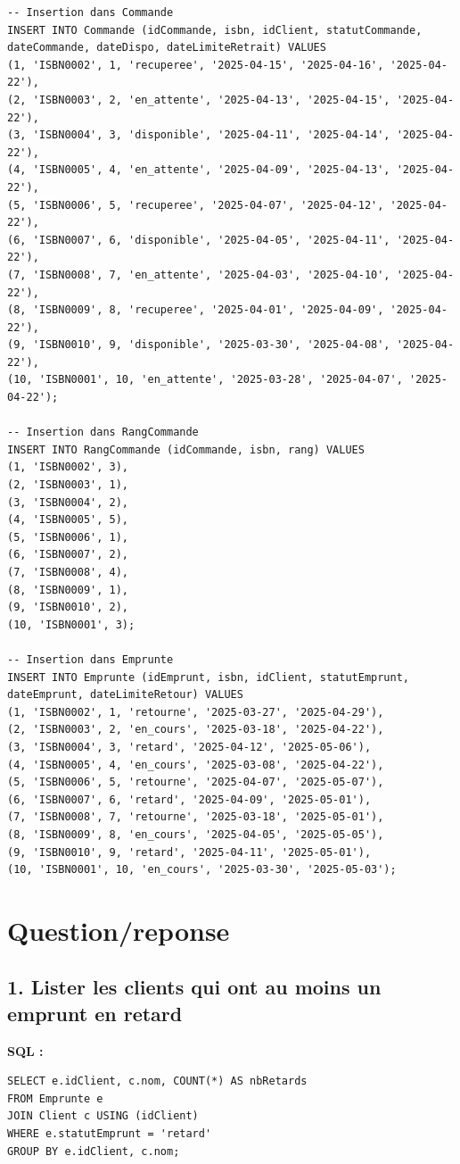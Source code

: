 \documentclass{article}
\begin{document}
\begin{lstlisting}
-- Insertion dans Commande
INSERT INTO Commande (idCommande, isbn, idClient, statutCommande, dateCommande, dateDispo, dateLimiteRetrait) VALUES
(1, 'ISBN0002', 1, 'recuperee', '2025-04-15', '2025-04-16', '2025-04-22'),
(2, 'ISBN0003', 2, 'en_attente', '2025-04-13', '2025-04-15', '2025-04-22'),
(3, 'ISBN0004', 3, 'disponible', '2025-04-11', '2025-04-14', '2025-04-22'),
(4, 'ISBN0005', 4, 'en_attente', '2025-04-09', '2025-04-13', '2025-04-22'),
(5, 'ISBN0006', 5, 'recuperee', '2025-04-07', '2025-04-12', '2025-04-22'),
(6, 'ISBN0007', 6, 'disponible', '2025-04-05', '2025-04-11', '2025-04-22'),
(7, 'ISBN0008', 7, 'en_attente', '2025-04-03', '2025-04-10', '2025-04-22'),
(8, 'ISBN0009', 8, 'recuperee', '2025-04-01', '2025-04-09', '2025-04-22'),
(9, 'ISBN0010', 9, 'disponible', '2025-03-30', '2025-04-08', '2025-04-22'),
(10, 'ISBN0001', 10, 'en_attente', '2025-03-28', '2025-04-07', '2025-04-22');

-- Insertion dans RangCommande
INSERT INTO RangCommande (idCommande, isbn, rang) VALUES
(1, 'ISBN0002', 3),
(2, 'ISBN0003', 1),
(3, 'ISBN0004', 2),
(4, 'ISBN0005', 5),
(5, 'ISBN0006', 1),
(6, 'ISBN0007', 2),
(7, 'ISBN0008', 4),
(8, 'ISBN0009', 1),
(9, 'ISBN0010', 2),
(10, 'ISBN0001', 3);

-- Insertion dans Emprunte
INSERT INTO Emprunte (idEmprunt, isbn, idClient, statutEmprunt, dateEmprunt, dateLimiteRetour) VALUES
(1, 'ISBN0002', 1, 'retourne', '2025-03-27', '2025-04-29'),
(2, 'ISBN0003', 2, 'en_cours', '2025-03-18', '2025-04-22'),
(3, 'ISBN0004', 3, 'retard', '2025-04-12', '2025-05-06'),
(4, 'ISBN0005', 4, 'en_cours', '2025-03-08', '2025-04-22'),
(5, 'ISBN0006', 5, 'retourne', '2025-04-07', '2025-05-07'),
(6, 'ISBN0007', 6, 'retard', '2025-04-09', '2025-05-01'),
(7, 'ISBN0008', 7, 'retourne', '2025-03-18', '2025-05-01'),
(8, 'ISBN0009', 8, 'en_cours', '2025-04-05', '2025-05-05'),
(9, 'ISBN0010', 9, 'retard', '2025-04-11', '2025-05-01'),
(10, 'ISBN0001', 10, 'en_cours', '2025-03-30', '2025-05-03');
\end{lstlisting}

\section{Question/reponse}
\subsection*{1. Lister les clients qui ont au moins un emprunt en retard}

\textbf{SQL :}
\begin{lstlisting}
SELECT e.idClient, c.nom, COUNT(*) AS nbRetards
FROM Emprunte e
JOIN Client c USING (idClient)
WHERE e.statutEmprunt = 'retard'
GROUP BY e.idClient, c.nom;
\end{lstlisting}
\end{document}
